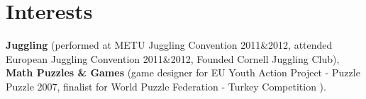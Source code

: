 \section{\mysidestyle \textcolor{olgray}{Interests}}
\textbf{Juggling} (performed at METU Juggling Convention 2011\&2012, attended European Juggling Convention 2011\&2012, Founded Cornell Juggling Club), \textbf{Math Puzzles \& Games} (game designer for EU Youth Action Project - Puzzle Puzzle 2007, finalist for World Puzzle Federation - Turkey Competition ).



